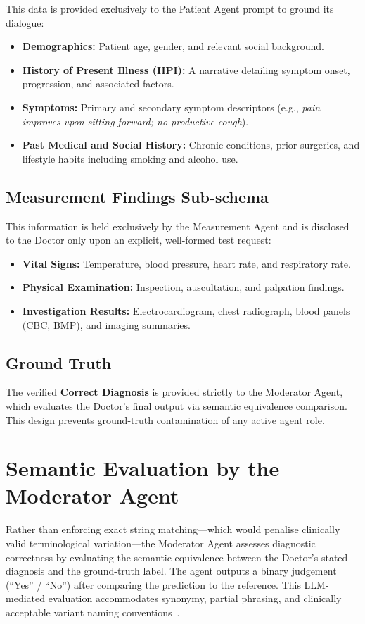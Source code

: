 This data is provided exclusively to the Patient Agent prompt to ground its dialogue:
\begin{itemize}
    \item \textbf{Demographics:} Patient age, gender, and relevant social background.
    \item \textbf{History of Present Illness (HPI):} A narrative detailing symptom onset, progression, and associated factors.
    \item \textbf{Symptoms:} Primary and secondary symptom descriptors (e.g., \textit{pain improves upon sitting forward; no productive cough}).
    \item \textbf{Past Medical and Social History:} Chronic conditions, prior surgeries, and lifestyle habits including smoking and alcohol use.
\end{itemize}

\subsection{Measurement Findings Sub-schema}

This information is held exclusively by the Measurement Agent and is disclosed to the Doctor only upon an explicit, well-formed test request:
\begin{itemize}
    \item \textbf{Vital Signs:} Temperature, blood pressure, heart rate, and respiratory rate.
    \item \textbf{Physical Examination:} Inspection, auscultation, and palpation findings.
    \item \textbf{Investigation Results:} Electrocardiogram, chest radiograph, blood panels (CBC, BMP), and imaging summaries.
\end{itemize}

\subsection{Ground Truth}

The verified \textbf{Correct Diagnosis} is provided strictly to the Moderator Agent, which evaluates the Doctor's final output via semantic equivalence comparison. This design prevents ground-truth contamination of any active agent role.

\section{Semantic Evaluation by the Moderator Agent}

Rather than enforcing exact string matching---which would penalise clinically valid terminological variation---the Moderator Agent assesses diagnostic correctness by evaluating the semantic equivalence between the Doctor's stated diagnosis and the ground-truth label. The agent outputs a binary judgement (``Yes'' / ``No'') after comparing the prediction to the reference. This LLM-mediated evaluation accommodates synonymy, partial phrasing, and clinically acceptable variant naming conventions~\cite{schmidgall2024agentclinic}.
